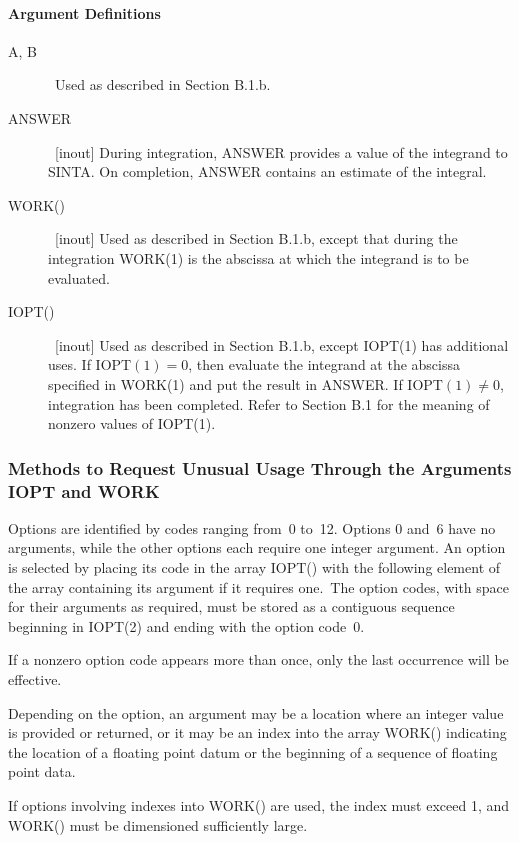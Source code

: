 \documentclass[twoside]{MATH77}
\begin{document}
\paragraph{Argument Definitions\label{ArgDefRC}}
\begin{description}
\item[A, B]  \ Used as described in Section B.1.b.
\item[ANSWER]  \ [inout] During integration, ANSWER provides a value of the
integrand to SINTA. On completion, ANSWER contains an estimate of the
integral.
\item[WORK()]  \ [inout] Used as described in Section B.1.b, except that
during the integration WORK(1) is the abscissa at which the integrand is to
be evaluated.
\item[IOPT()]  \ [inout] Used as described in Section B.1.b, except IOPT(1)
has additional uses. If IOPT$(1)=0$, then evaluate the integrand at the
abscissa specified in WORK(1) and put the result in ANSWER. If IOPT$(1)\neq
0$, integration has been completed. Refer to Section B.1 for the meaning of
nonzero values of IOPT(1).
\end{description}

\subsubsection{Methods to Request Unusual Usage Through the Arguments IOPT
and WORK\label{UnusualUse}}

Options are identified by codes ranging from~0 to~12. Options 0 and~6 have
no arguments, while the other options each require one integer argument. An
option is selected by placing its code in the array IOPT() with the
following element of the array containing its argument if it requires one.\
The option codes, with space for their arguments as required, must be stored
as a contiguous sequence beginning in IOPT(2) and ending with the option
code~0.

If a nonzero option code appears more than once, only the last occurrence
will be effective.

Depending on the option, an argument may be a location where an
integer value is provided or returned, or it may be an index into the
array WORK() indicating the location of a floating point datum or the
beginning of a sequence of floating point data.

If options involving indexes into WORK() are used, the index must exceed 1,
and WORK() must be dimensioned sufficiently large.
\end{document}

